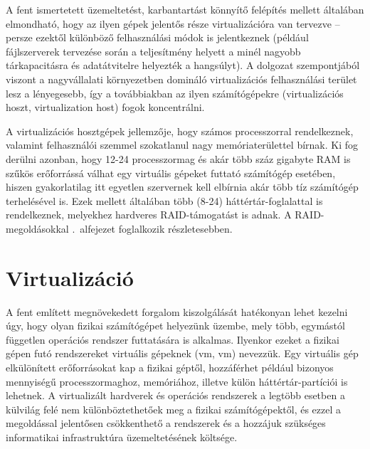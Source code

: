 A fent ismertetett üzemeltetést, karbantartást könnyítő felépítés mellett általában elmondható, hogy az ilyen gépek jelentős része virtualizációra van tervezve -- persze ezektől különböző felhasználási módok is jelentkeznek (például fájlszerverek tervezése során a teljesítmény helyett a minél nagyobb tárkapacitásra és adatátvitelre helyezték a hangsúlyt). A dolgozat szempontjából viszont a nagyvállalati környezetben domináló virtualizációs felhasználási terület lesz a lényegesebb, így a továbbiakban az ilyen számítógépekre (virtualizációs hoszt, virtualization host) fogok koncentrálni.

A virtualizációs hosztgépek jellemzője, hogy számos processzorral rendelkeznek, valamint felhasználói szemmel szokatlanul nagy memóriaterülettel bírnak. Ki fog derülni azonban, hogy 12-24 processzormag és akár több száz gigabyte RAM is szűkös erőforrássá válhat egy virtuális gépeket futtató számítógép esetében, hiszen gyakorlatilag itt egyetlen szervernek kell elbírnia akár több tíz számítógép terhelésével is. Ezek mellett általában több (8-24) háttértár-foglalattal is rendelkeznek, melyekhez hardveres RAID-támogatást is adnak. A RAID-megoldásokkal .~alfejezet foglalkozik részletesebben.

\section{Virtualizáció}
A fent említett megnövekedett forgalom kiszolgálását hatékonyan lehet kezelni úgy, hogy olyan fizikai számítógépet helyezünk üzembe, mely  több, egymástól független operációs rendszer futtatására is alkalmas. Ilyenkor ezeket a fizikai gépen futó rendszereket virtuális gépeknek (\acrlong{vm}, \acrshort{vm}) nevezzük. Egy virtuális gép elkülönített erőforrásokat kap a fizikai géptől, hozzáférhet például bizonyos mennyiségű processzormaghoz, memóriához, illetve külön háttértár-partíciói is lehetnek. A virtualizált hardverek és operációs rendszerek a legtöbb esetben a külvilág felé nem különböztethetőek meg a fizikai számítógépektől, és ezzel a megoldással jelentősen csökkenthető a rendszerek és a hozzájuk szükséges informatikai infrastruktúra üzemeltetésének költsége.

